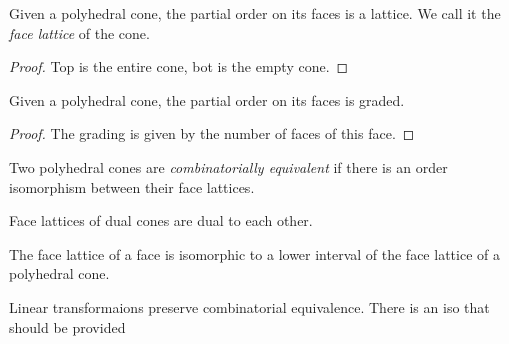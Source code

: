 \begin{lemma}
  \label{face-lattice}
  \lean{}
  \leanok
  Given a polyhedral cone, the partial order on its faces
  is a lattice. We call it the \emph{face lattice} of the cone.
\end{lemma}
\begin{proof}
Top is the entire cone, bot is the empty cone.
\end{proof}

\begin{lemma}
  \label{face-lattice-graded}
  \lean{}
  \leanok
  Given a polyhedral cone, the partial order on its faces
  is graded.
\end{lemma}
\begin{proof}
The grading is given by the number of faces of this face.
\end{proof}

\begin{definition}
  \label{combinatorial-equivalence}
  \lean{}
  \leanok
  Two polyhedral cones are \emph{combinatorially equivalent} if there
  is an order isomorphism between their face lattices.
\end{definition}

\begin{proposition}
  \label{dual-face-lattice}
  \lean{}
  \leanok
  Face lattices of dual cones are dual to each other.
\end{proposition}

\begin{proposition}
  \label{face-face-lattice}
  \lean{}
  \leanok
  The face lattice of a face is isomorphic to a lower interval of the face lattice of a polyhedral cone.
\end{proposition}

\begin{proposition}
  \label{ombinatorial-equivalence-linear-transformaions}
  \lean{}
  \leanok
  Linear transformaions preserve combinatorial equivalence. There is an iso that should be provided
\end{proposition}



